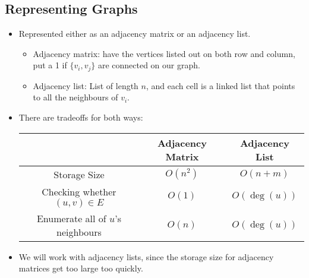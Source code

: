 	\subsection{Representing Graphs}
	\begin{itemize}
		\item Represented either as an adjacency matrix or an adjacency list.  
			\begin{itemize}
				\item Adjacency matrix: have the vertices listed out on both row and column, put a 1 if 
					$\{v_i, v_j\}$ are connected on our graph.
				\item Adjacency list: List of length $n$, and each cell is a linked list that points 
					to all the neighbours of $v_i$.
			\end{itemize}
		\item There are tradeoffs for both ways:
			\begin{center}
				\begin{tabular}{c|c|c}
			& 	\textbf{Adjacency Matrix} & \textbf{Adjacency List}\\
			\hline
					Storage Size  & $O(n^2)$  & $O(n + m)$\\
				Checking whether $(u, v) \in E$ & $O(1)$ & $O(\deg(u))$\\
				Enumerate all of $u$'s neighbours &  $O(n)$ & $O(\deg(u))$
				\end{tabular}
			\end{center} 
		\item We will work with adjacency lists, since the storage size for adjacency matrices get
			too large too quickly. 
	\end{itemize}
